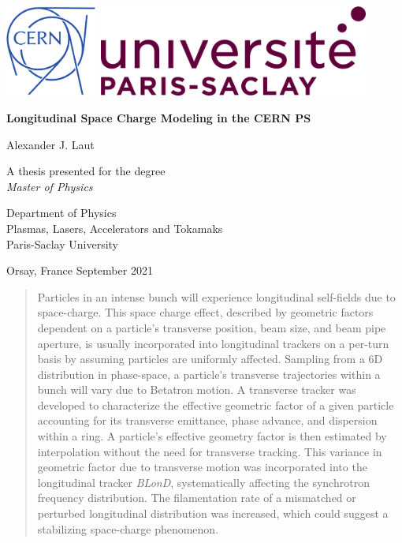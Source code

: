\begin{titlepage}
    \centering
  
    \includegraphics[height=3cm, width=3cm]{logos/LogoOutline-Bleu.pdf} 
    \hfill
    \includegraphics[height=3cm, width=9cm]{logos/logo.png}

    \vfill
        
    \Huge
    \textbf{Longitudinal Space Charge Modeling in the CERN PS}
        
    \vspace{1cm}
    
    \Huge
    Alexander J. Laut

    \vfill

    \LARGE
    A thesis presented for the degree\\
    \textit{Master of Physics}

    \vfill

    Department of Physics\\
    Plasmas, Lasers, Accelerators and Tokamaks\\
    Paris-Saclay University\\
    \vfill

    \Large
    Orsay, France \hfill September 2021
\end{titlepage}

\begin{abstract}
Particles in an intense bunch will experience longitudinal self-fields due to space-charge. This space charge effect, described by geometric factors dependent on a particle’s transverse position, beam size, and beam pipe aperture, is usually incorporated into longitudinal trackers on a per-turn basis by assuming particles are uniformly affected. Sampling from a 6D distribution in phase-space, a particle's transverse trajectories within a bunch will vary due to Betatron motion. A transverse tracker was developed to characterize the effective geometric factor of a given particle accounting for its transverse emittance, phase advance, and dispersion within a ring. A particle’s effective geometry factor is then estimated by interpolation without the need for transverse tracking. This variance in geometric factor due to transverse motion was incorporated into the longitudinal tracker \textit{BLonD}, systematically affecting the synchrotron frequency distribution. The filamentation rate of a mismatched or perturbed longitudinal distribution was increased, which could suggest a stabilizing space-charge phenomenon.
\end{abstract}


